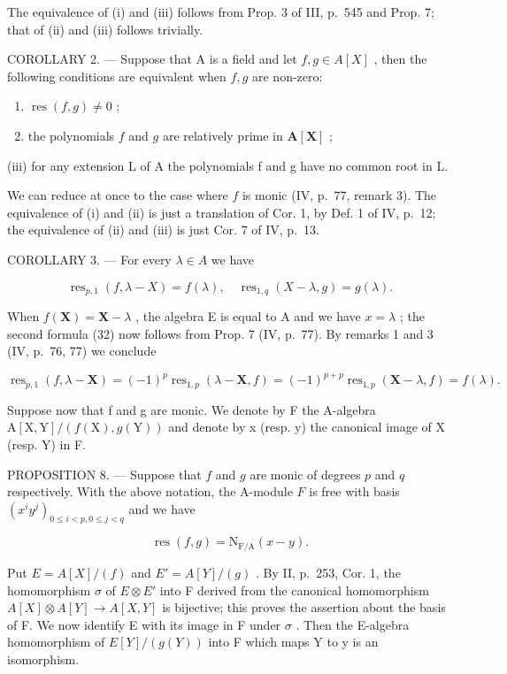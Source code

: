 The equivalence of (i) and (iii) follows from Prop. 3 of III, p.~545 and Prop. 7; that of (ii) and (iii) follows trivially.

COROLLARY 2. --- Suppose that A is a field and let \(f, g \in A[X]\) , then the following conditions are equivalent when \(f, g\) are non-zero:

\begin{enumerate}
\def\labelenumi{(\roman{enumi})}
\item
  \(\operatorname{res}(f, g) \neq 0\) ;
\item
  the polynomials \(f\) and \(g\) are relatively prime in \(\mathbf{A}[\mathbf{X}]\) ;
\end{enumerate}

(iii) for any extension L of A the polynomials f and g have no common root in L.

We can reduce at once to the case where \(f\) is monic (IV, p.~77, remark 3). The equivalence of (i) and (ii) is just a translation of Cor. 1, by Def. 1 of IV, p.~12; the equivalence of (ii) and (iii) is just Cor. 7 of IV, p.~13.

COROLLARY 3. --- For every \(\lambda \in A\) we have

\[
\operatorname{res} _ {p, 1} (f, \lambda - X) = f (\lambda), \quad \operatorname{res} _ {1, q} (X - \lambda , g) = g (\lambda).\tag{32}
\]

When \(f(\mathbf{X}) = \mathbf{X} - \lambda\) , the algebra E is equal to A and we have \(x = \lambda\) ; the second formula (32) now follows from Prop. 7 (IV, p.~77). By remarks 1 and 3 (IV, p.~76, 77) we conclude

\[
\operatorname{res} _ {p, 1} (f, \lambda - \mathbf {X}) = (- 1) ^ {p} \operatorname{res} _ {1, p} (\lambda - \mathbf {X}, f) = (- 1) ^ {p + p} \operatorname{res} _ {1, p} (\mathbf {X} - \lambda , f) = f (\lambda).
\]

Suppose now that f and g are monic. We denote by F the A-algebra \(\mathrm{A}[\mathrm{X},\mathrm{Y}]/(f(\mathrm{X}),g(\mathrm{Y}))\) and denote by x (resp. y) the canonical image of X (resp. Y) in F.

PROPOSITION 8. --- Suppose that \(f\) and \(g\) are monic of degrees \(p\) and \(q\) respectively. With the above notation, the A-module \(F\) is free with basis \((x^i y^j)_{0 \leq i < p, 0 \leq j < q}\) and we have

\[
\operatorname{res} (f, g) = \mathrm{N} _ {\mathrm{F/A}} (x - y).\tag{33}
\]

Put \(E = A[X]/(f)\) and \(E' = A[Y]/(g)\) . By II, p.~253, Cor. 1, the homomorphism \(\sigma\) of \(E \otimes E'\) into F derived from the canonical homomorphism \(A[X] \otimes A[Y] \to A[X,Y]\) is bijective; this proves the assertion about the basis of F. We now identify E with its image in F under \(\sigma\) . Then the E-algebra homomorphism of \(E[Y]/(g(Y))\) into F which maps Y to y is an isomorphism.

